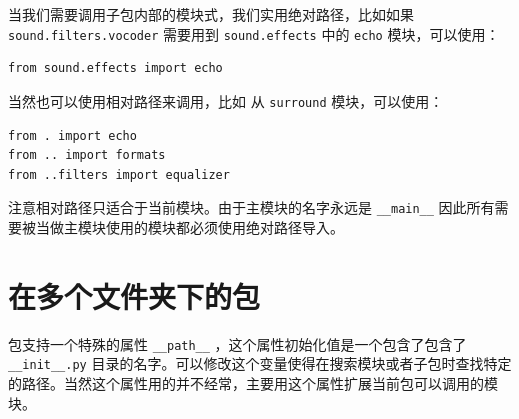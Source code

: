 \documentclass[10pt,a4paper,UTF8]{article}
\begin{document}
当我们需要调用子包内部的模块式，我们实用绝对路径，比如如果 \texttt{sound.filters.vocoder} 需要用到 \texttt{sound.effects} 中的 \texttt{echo} 模块，可以使用：
\begin{verbatim}
from sound.effects import echo
\end{verbatim}

当然也可以使用相对路径来调用，比如 从 \texttt{surround} 模块，可以使用：
\begin{verbatim}
from . import echo
from .. import formats
from ..filters import equalizer
\end{verbatim}

注意相对路径只适合于当前模块。由于主模块的名字永远是 \texttt{\_\_main\_\_} 因此所有需要被当做主模块使用的模块都必须使用绝对路径导入。
\section{在多个文件夹下的包}
\label{sec:org2908df0}


包支持一个特殊的属性 \texttt{\_\_path\_\_} ，这个属性初始化值是一个包含了包含了 \texttt{\_\_init\_\_.py} 目录的名字。可以修改这个变量使得在搜索模块或者子包时查找特定的路径。当然这个属性用的并不经常，主要用这个属性扩展当前包可以调用的模块。
\end{document}
